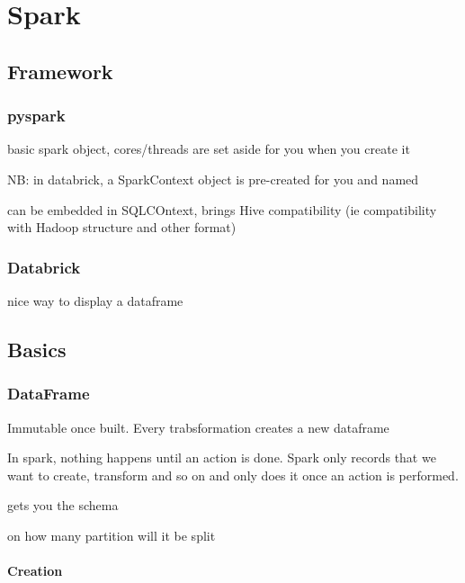 \chapter{Spark}


\section{Framework}

	\subsection{pyspark }

		 basic spark object, cores/threads are set aside for you when you create it


		NB: in databrick, a SparkContext object is pre-created for you and named 


		 can be embedded in SQLCOntext, brings Hive compatibility (ie compatibility with Hadoop structure and other format)


	\subsection{Databrick}

		 nice way to display a dataframe



\section{Basics}

	\subsection{DataFrame}

		Immutable once built. Every trabsformation creates a new dataframe


		In spark, nothing happens until an action is done. Spark only records that we want to create, transform and so on and only does it once an action is performed.

		 gets you the schema

		 on how many partition will it be split

		\subsubsection{Creation}

